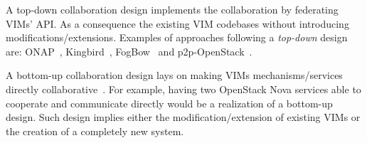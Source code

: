 A top-down collaboration design implements the collaboration by federating
VIMs' API. As a consequence the existing VIM codebases without introducing
modifications/extensions. Examples of approaches following a \emph{top-down}
design are: ONAP~\cite{onap}, Kingbird~\cite{kingbird},
FogBow~\cite{brasileiro2016fogbow} and p2p-OpenStack~\cite{ericsson-p2p}.

A bottom-up collaboration design lays on making VIMs
mechanisms/services directly collaborative~\cite{7923796}. For example, having two
OpenStack Nova services able to cooperate and communicate directly
would be a realization of a bottom-up design. Such design implies
either the modification/extension of existing VIMs or the creation of
a completely new system.
